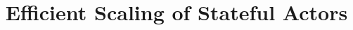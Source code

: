 \documentclass[letterpaper,twocolumn,10pt]{article}
\begin{document}
\date{}

\title{\Large \bf Efficient Scaling of Stateful Actors}

\author{
} %

\maketitle

\thispagestyle{empty}

%



%

%

%

%

%

{\footnotesize 
}


%
\end{document}

